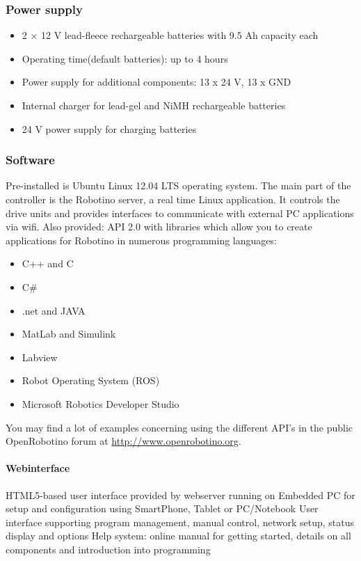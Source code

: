 \documentclass[12pt,twoside]{article}
\begin{document}
\begin{appendix}
\subsubsection{Power supply}
\begin{itemize}
\item 2 $\times$ 12 V lead-fleece rechargeable batteries with 9.5 Ah
  capacity each
\item Operating time(default batteries): up to 4 hours
\item Power supply for additional components: 13 x 24 V, 13 x GND
\item Internal charger for lead-gel and NiMH rechargeable batteries
\item 24 V power supply for charging batteries
\end{itemize}

\subsubsection{Software}
Pre-installed is Ubuntu Linux 12.04 LTS operating system. The main
part of the controller is the Robotino server, a real time Linux
application. It controls the drive units and provides interfaces to
communicate with external PC applications via wifi. Also provided: API
2.0 with libraries which allow you to create applications for Robotino
in numerous programming languages:

\begin{itemize}
\item C++ and C 
\item C\# 
\item .net and JAVA 
\item MatLab and Simulink
\item Labview
\item Robot Operating System (ROS)
\item Microsoft Robotics Developer Studio
\end{itemize}

You may find a lot of examples concerning using the different API's in
the public OpenRobotino forum at \url{http://www.openrobotino.org}.

\paragraph{Webinterface}
HTML5-based user interface provided by webserver running on Embedded
PC for setup and configuration using SmartPhone, Tablet or PC/Notebook
User interface supporting program management, manual control, network
setup, status display and options Help system: online manual for
getting started, details on all components and introduction into
programming


\end{appendix}
\end{document}
